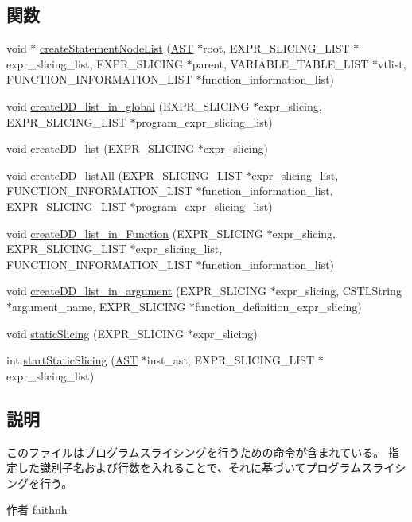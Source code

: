 \subsection*{関数}
\begin{DoxyCompactItemize}
\item 
void $\ast$ \hyperlink{ProgramSlicing_8h_a6a2ca14664f7ed318ed7f4a56ea79560}{createStatementNodeList} (\hyperlink{structabstract__syntax__tree}{AST} $\ast$root, EXPR\_\-SLICING\_\-LIST $\ast$expr\_\-slicing\_\-list, EXPR\_\-SLICING $\ast$parent, VARIABLE\_\-TABLE\_\-LIST $\ast$vtlist, FUNCTION\_\-INFORMATION\_\-LIST $\ast$function\_\-information\_\-list)
\item 
void \hyperlink{ProgramSlicing_8h_a7482809fe7168aab7be5176c11ccdaf8}{createDD\_\-list\_\-in\_\-global} (EXPR\_\-SLICING $\ast$expr\_\-slicing, EXPR\_\-SLICING\_\-LIST $\ast$program\_\-expr\_\-slicing\_\-list)
\item 
void \hyperlink{ProgramSlicing_8h_ad1682bc84f12e54629e4d7ceb4b34e30}{createDD\_\-list} (EXPR\_\-SLICING $\ast$expr\_\-slicing)
\item 
void \hyperlink{ProgramSlicing_8h_a8e5922cd376066300931a42aa9a263fa}{createDD\_\-listAll} (EXPR\_\-SLICING\_\-LIST $\ast$expr\_\-slicing\_\-list, FUNCTION\_\-INFORMATION\_\-LIST $\ast$function\_\-information\_\-list, EXPR\_\-SLICING\_\-LIST $\ast$program\_\-expr\_\-slicing\_\-list)
\item 
void \hyperlink{ProgramSlicing_8h_aefec4daeb571c2b448091c4f8bc81201}{createDD\_\-list\_\-in\_\-Function} (EXPR\_\-SLICING $\ast$expr\_\-slicing, EXPR\_\-SLICING\_\-LIST $\ast$expr\_\-slicing\_\-list, FUNCTION\_\-INFORMATION\_\-LIST $\ast$function\_\-information\_\-list)
\item 
void \hyperlink{ProgramSlicing_8h_a2ff3f358e5ececbd7410b57db736f8bf}{createDD\_\-list\_\-in\_\-argument} (EXPR\_\-SLICING $\ast$expr\_\-slicing, CSTLString $\ast$argument\_\-name, EXPR\_\-SLICING $\ast$function\_\-definition\_\-expr\_\-slicing)
\item 
void \hyperlink{ProgramSlicing_8h_a138a79f2268c9b23ea7c2777bf9dd9a6}{staticSlicing} (EXPR\_\-SLICING $\ast$expr\_\-slicing)
\item 
int \hyperlink{ProgramSlicing_8h_adb143d3b1bb729d23cf620666c81b063}{startStaticSlicing} (\hyperlink{structabstract__syntax__tree}{AST} $\ast$inst\_\-ast, EXPR\_\-SLICING\_\-LIST $\ast$expr\_\-slicing\_\-list)
\end{DoxyCompactItemize}


\subsection{説明}
このファイルはプログラムスライシングを行うための命令が含まれている。 指定した識別子名および行数を入れることで、それに基づいてプログラムスライシングを行う。 \begin{DoxyAuthor}{作者}
faithnh 
\end{DoxyAuthor}


